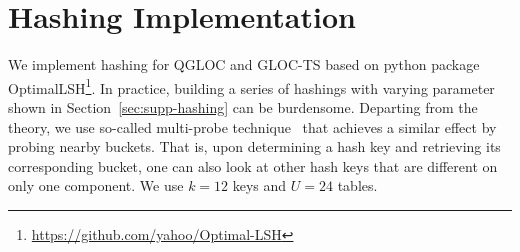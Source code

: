 \section{Hashing Implementation}

We implement hashing for QGLOC and GLOC-TS based on python package OptimalLSH\footnote{\url{https://github.com/yahoo/Optimal-LSH}}.
In practice, building a series of hashings with varying parameter shown in Section~\ref{sec:supp-hashing} can be burdensome.
Departing from the theory, we use so-called multi-probe technique~\cite{slaney12optimal} that achieves a similar effect by probing nearby buckets.
That is, upon determining a hash key and retrieving its corresponding bucket, one can also look at other hash keys that are different on only one component.
We use $k=12$ keys and $U=24$ tables.

